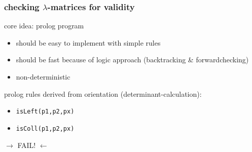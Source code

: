 \documentclass{beamer}
\begin{document}


\begin{frame}
\frametitle{checking $\lambda$-matrices for validity}
core idea: prolog program
\begin{itemize}
	\item should be easy to implement with simple rules
	\item should be fast because of logic approach (backtracking \& forwardchecking)
	\item non-deterministic
\end{itemize}
prolog rules derived from orientation (determinant-calculation):
\begin{itemize}
 \item \texttt{isLeft(p1,p2,px)}
 \item \texttt{isColl(p1,p2,px)}
\end{itemize}
\pause
\begin{center}
\huge{ $\rightarrow$ FAIL! $\leftarrow$}
\end{center}

\end{frame}
\end{document}
